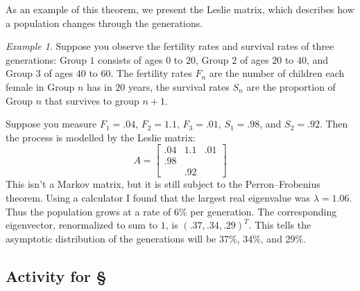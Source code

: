\documentclass[11pt,oneside]{amsbook}
\theoremstyle{definition}
\theoremstyle{plain}
\theoremstyle{definition}
\theoremstyle{remark}
\newtheorem{example}[theorem]{Example}
\numberwithin{equation}{section}
\numberwithin{figure}{section}
\begin{document}
As an example of this theorem, we present the Leslie matrix, which describes how a population changes through the generations.
  
\begin{example}
  Suppose you observe the fertility rates and survival rates of three generations: Group $1$ consists of ages $0$ to $20$, Group $2$ of ages $20$ to $40$, and Group $3$ of ages $40$ to $60$. The fertility rates $F_n$ are the number of children each female in Group $n$ has in $20$ years, the survival rates $S_n$ are the proportion of Group $n$ that survives to group $n+1$.

  Suppose you measure $F_1=.04$, $F_2=1.1$, $F_3=.01$, $S_1=.98$, and $S_2=.92$. Then the process is modelled by the Leslie matrix:
  \[A=\begin{bmatrix}.04&1.1&.01\\.98\\&.92\end{bmatrix}
  \]
  This isn't a Markov matrix, but it is still subject to the Perron--Frobenius theorem. Using a calculator I found that the largest real eigenvalue was $\lambda=1.06$. Thus the population grows at a rate of 6\% per generation. The corresponding eigenvector, renormalized to sum to $1$, is $(.37,.34,.29)^T$. This tells the asymptotic distribution of the generations will be 37\%, 34\%, and 29\%.
\end{example}

\newpage
\subsection*{Activity for \S \thesection}
\end{document}
